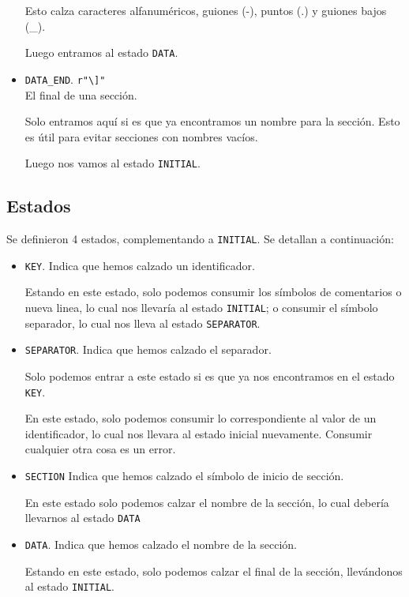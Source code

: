 \documentclass[spanish, fleqn]{article}
\begin{document}
\begin{itemize}
    Esto calza caracteres alfanuméricos, guiones (-), puntos (.) y guiones bajos (\_).
    
    Luego entramos al estado \texttt{DATA}.
    
    \item \texttt{DATA\_END}. \texttt{r"\textbackslash ]"} \\ El final de una sección. 
    
    Solo entramos aquí si es que ya encontramos un nombre para la sección. Esto es útil para evitar secciones con nombres vacíos.
    
    Luego nos vamos al estado \texttt{INITIAL}.
\end{itemize}

\subsection{Estados}
Se definieron 4 estados, complementando a \texttt{INITIAL}. Se detallan a continuación:

\begin{itemize}
    \item \texttt{KEY}. Indica que hemos calzado un identificador.
    
    Estando en este estado, solo podemos consumir los símbolos de comentarios o nueva linea, lo cual nos llevaría al estado \texttt{INITIAL}; o consumir el símbolo separador, lo cual nos lleva al estado \texttt{SEPARATOR}.
    
    \item \texttt{SEPARATOR}. Indica que hemos calzado el separador.
    
    Solo podemos entrar a este estado si es que ya nos encontramos en el estado \texttt{KEY}.
    
    En este estado, solo podemos consumir lo correspondiente al valor de un identificador, lo cual nos llevara al estado inicial nuevamente. Consumir cualquier otra cosa es un error.
    
    \item \texttt{SECTION} Indica que hemos calzado el símbolo de inicio de sección.
    
    En este estado solo podemos calzar el nombre de la sección, lo cual debería llevarnos al estado \texttt{DATA}
    
    \item \texttt{DATA}. Indica que hemos calzado el nombre de la sección.
    
    Estando en este estado, solo podemos calzar el final de la sección, llevándonos al estado \texttt{INITIAL}.
\end{itemize}
\end{document}
